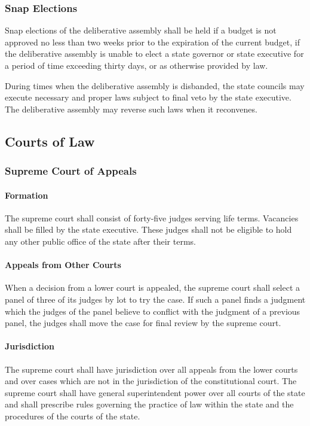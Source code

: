 \documentclass{article}
\begin{document}
\subsubsection{Snap Elections}
Snap elections of the deliberative assembly shall be held if a budget is not approved no less than two weeks prior to the expiration of the current budget, if the deliberative assembly is unable to elect a state governor or state executive for a period of time exceeding thirty days, or as otherwise provided by law.

During times when the deliberative assembly is disbanded, the state councils may execute necessary and proper laws subject to final veto by the state executive. The deliberative assembly may reverse such laws when it reconvenes.
\subsection{Courts of Law}
\subsubsection{Supreme Court of Appeals}
\paragraph{Formation}
The supreme court shall consist of forty-five judges serving life terms. Vacancies shall be filled by the state executive. These judges shall not be eligible to hold any other public office of the state after their terms.
\paragraph{Appeals from Other Courts}
When a decision from a lower court is appealed, the supreme court shall select a panel of three of its judges by lot to try the case. If such a panel finds a judgment which the judges of the panel believe to conflict with the judgment of a previous panel, the judges shall move the case for final review by the supreme court.
\paragraph{Jurisdiction}
The supreme court shall have jurisdiction over all appeals from the lower courts and over cases which are not in the jurisdiction of the constitutional court. The supreme court shall have general superintendent power over all courts of the state and shall prescribe rules governing the practice of law within the state and the procedures of the courts of the state.
\end{document}
